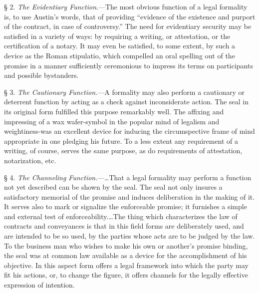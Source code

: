 
{\S} 2. \textit{The Evidentiary Function}.---The most obvious function of a
legal formality is, to use Austin's words, that of providing ``evidence of the
existence and purport of the contract, in case of controversy.'' The need for
evidentiary security may be satisfied in a variety of ways: by requiring a
writing, or attestation, or the certification of a notary. It may even be
satisfied, to some extent, by such a device as the Roman stipulatio, which
compelled an oral spelling out of the promise in a manner sufficiently
ceremonious to impress its terms on participants and possible bystanders. 

{\S} 3. \textit{The Cautionary Function.}---A formality may also perform a
cautionary or deterrent function by acting as a check against inconsiderate
action. The seal in its original form fulfilled this purpose remarkably well.
The affixing and impressing of a wax wafer-symbol in the popular mind of
legalism and weightiness-was an excellent device for inducing the
circumspective frame of mind appropriate in one pledging his future. To a less
extent any requirement of a writing, of course, serves the same purpose, as do
requirements of attestation, notarization, etc. 

{\S} 4. \textit{The Channeling Function}.---\ldots That a legal formality may
perform a function not yet described can be shown by the seal. The seal not
only insures a satisfactory memorial of the promise and induces deliberation in
the making of it. It serves also to mark or signalize the enforceable promise;
it furnishes a simple and external test of enforceability.\ldots The thing which
characterizes the law of contracts and conveyances is that in this field forms
are deliberately used, and are intended to be so used, by the parties whose
acts are to be judged by the law. To the business man who wishes to make his
own or another's promise binding, the seal was at common law available as a
device for the accomplishment of his objective. In this aspect form offers a
legal framework into which the party may fit his actions, or, to change the
figure, it offers channels for the legally effective expression of intention. 

